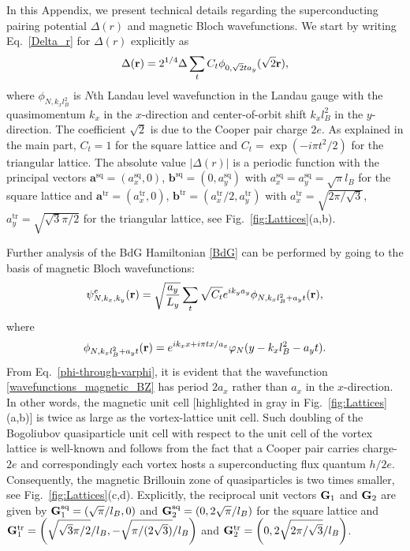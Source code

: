 \documentclass[10pt,prb,aps,superscriptaddress,amsmath,amssymb,twocolumn,floatfix,longbibliography]{revtex4-1}
\newcommand{\be}{\begin{equation} }
\newcommand{\ee}{\end{equation}}
\newcommand{\br}{{\bf r}}
\newcommand{\bG}{{\bf G}}
\begin{document}
In this Appendix, we present technical details regarding the superconducting pairing potential $\Delta(r)$ and magnetic Bloch wavefunctions. We start by writing Eq.~\eqref{Delta_r} for $\Delta(r)$ explicitly as \cite{Abrikosov_vortex_lattice}
\be 
	 \Delta(\br) = 2^{1/4} \Delta \sum_t C_t \phi_{0, \sqrt{2} t a_y} (\sqrt{2}\br),
\ee
where $\phi_{N, k_x l_B^2}$ is $N$th Landau level wavefunction in the Landau gauge with the quasimomentum $k_x$ in the $x$-direction and center-of-orbit shift $k_x l_B^2$ in the $y$-direction. The coefficient $\sqrt{2}$ is due to the Cooper pair charge $2e$. As explained in the main part, $C_t = 1$ for the square lattice and $C_t = \exp (-i \pi t^2 / 2)$ for the triangular lattice. The absolute value $|\Delta(r)|$ is a periodic function with the principal vectors $\bm{a}^{\text{sq}} = (a_x^{\text{sq}},0)$, $\bm{b}^{\text{sq}} = (0, a_y^{\text{sq}})$ with $a_x^{\text{sq}} = a_y^{\text{sq}} = \sqrt{\pi}l_B$ for the square lattice and $\bm{a}^{\text{tr}} = (a_x^{\text{tr}},0)$, $\bm{b}^{\text{tr}} = (a_x^{\text{tr}}/2, a_y^{\text{tr}})$ with $a_x^{\text{tr}} = \sqrt{2\pi/\sqrt{3}}$, $a_y^{\text{tr}} = \sqrt{\sqrt{3}\pi/2}$ for the triangular lattice, see Fig.~\ref{fig:Lattices}(a,b).


Further analysis of the BdG Hamiltonian \eqref{BdG} can be performed by going to the basis of magnetic Bloch wavefunctions:
\be \label{wavefunctions_magnetic_BZ}
	\psi_{N, k_x, k_y}^e (\br) = \sqrt{\frac{a_{y}}{L_{y}}} \sum_t \sqrt{C_t} e^{i k_y a_y} \phi_{N, k_x l_B^2 + a_y t} (\br),
\ee
where
\be \label{phi-through-varphi}
    \phi_{N, k_x l_B^2 + a_y t} (\br) = e^{ik_x x + i \pi t x / a_x} \varphi_{N} (y - k_x l_B^2 - a_y t). 
\ee
From Eq.~\eqref{phi-through-varphi}, it is evident that the wavefunction \eqref{wavefunctions_magnetic_BZ} has period $2a_x$ rather than $a_x$ in the $x$-direction. In other words, the magnetic unit cell [highlighted in gray in Fig.~\ref{fig:Lattices}(a,b)] is twice as large as the vortex-lattice unit cell. Such doubling of the Bogoliubov quasiparticle unit cell with respect to the unit cell of the vortex lattice is well-known \cite{Franz-Tesanovic, Liu-Franz} and %
follows from the fact that a Cooper pair carries charge-$2e$ and correspondingly each vortex hosts a superconducting flux quantum $h/2e$.  
Consequently, the magnetic Brillouin zone of quasiparticles is two times smaller, see Fig.~\ref{fig:Lattices}(c,d). Explicitly, the reciprocal unit vectors $\bG_1$ and $\bG_2$ are given by $\bG_1^{\text{sq}} = \left(\sqrt{\pi} / l_B,0 \right)$ and $\bG_2^{\text{sq}} = \left(0,2 \sqrt{\pi} / l_B \right)$ for the square lattice and $\bG_1^{\text{tr}} = \left(\sqrt{\sqrt{3}\pi/2}/l_B, -\sqrt{\pi/(2\sqrt{3})} /l_B \right)$ and $\bG_2^{\text{tr}} = \left(0, 2\sqrt{2\pi/\sqrt{3}}/l_B\right)$. 
\end{document}
